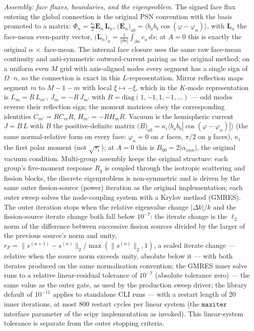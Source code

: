 \documentclass[11pt,a4paper]{article}
\begin{document}
\emph{Assembly: face fluxes, boundaries, and the eigenproblem.}
The signed face flux entering the global connection is the original
PSN convention with the basis promoted to a matrix:
$\Phi_n = \frac{\kappa_i}{2}\mathbf{E}_n\,\mathbf{L}_n$,
$\big(\mathbf{E}_n\big)_{ab}=\langle b_a b_b\cos(\varphi-\varphi_n)\rangle$,
with $\mathbf{L}_n$ the face-mean even-parity vector,
$\big(\mathbf{L}_n\big)_a = \frac{1}{|\partial n|}\int_{\partial n}
e_a\,ds$; at $A{=}0$ this is exactly the original $\alpha\,\times$
face-mean. The internal face closure uses the same raw face-mean
continuity and anti-symmetric outward-current pairing as the original
method; on a uniform even $M$ grid with axis-aligned nodes every
segment has a single sign of $\Omega\cdot n$, so the connection is
exact in this $L$-representation. Mirror reflection maps segment $m$ to
$M{-}1{-}m$ with local $\xi\mapsto-\xi$, which in the $K$-mode
representation is $L_m = R\,L_{m'}$, $J_m = -R\,J_{m'}$ with
$R=\mathrm{diag}(1,-1,1,-1,\ldots)$ --- odd modes reverse their
reflection sign; the moment matrices obey the corresponding identities
$C_{m'}=RC_mR$, $H_{m'}=-RH_mR$. Vacuum is the hemispheric current
$J = B\,L$ with $B$ the positive-definite matrix
$\bigl(B\bigr)_{ab}=\kappa_i\langle b_a b_b
|\cos(\varphi-\varphi_n)|\rangle$ (the same normal-relative form on
every face: $\varphi_n=0$ on $x$ faces, $\pi/2$ on $y$ faces), $\kappa_i$
the first polar
moment (not $\sqrt{\tau_i}$); at $A{=}0$ this is
$B_{00}=2|\alpha_{imn}|$, the original vacuum condition. Multi-group assembly keeps the original structure: each
group's five-moment response $R_g$ is coupled through the isotropic
scattering and fission blocks, the discrete eigenproblem is non-symmetric
and is driven by the same outer fission-source (power) iteration as the
original implementation; each outer sweep solves the node-coupling
system with a Krylov method (GMRES). The outer iteration stops when the
relative eigenvalue change $|\Delta k|/k$ and the fission-source
iterate change both fall below $10^{-7}$: the iterate change is the
$\ell_2$ norm of the difference between successive fission sources
divided by the larger of the previous source's norm and unity,
$r_F=\|s^{(n+1)}-s^{(n)}\|_2/\max(\|s^{(n)}\|_2,1)$, a scaled
iterate change --- relative when the source norm exceeds unity,
absolute below it --- with both iterates produced on the same
normalisation convention; the GMRES inner solve runs to a relative
linear-residual tolerance of $10^{-7}$ (absolute tolerance zero) --- the
same value as the outer gate, as used by the production sweep driver;
the library default of $10^{-11}$ applies to standalone CLI runs ---
with a restart length of $20$ inner iterations, at most $800$ restart
cycles per linear system (the $\mathtt{maxiter}$ interface parameter of the
scipy implementation as invoked). This
linear-system tolerance is separate from the outer stopping
criteria.
\end{document}
